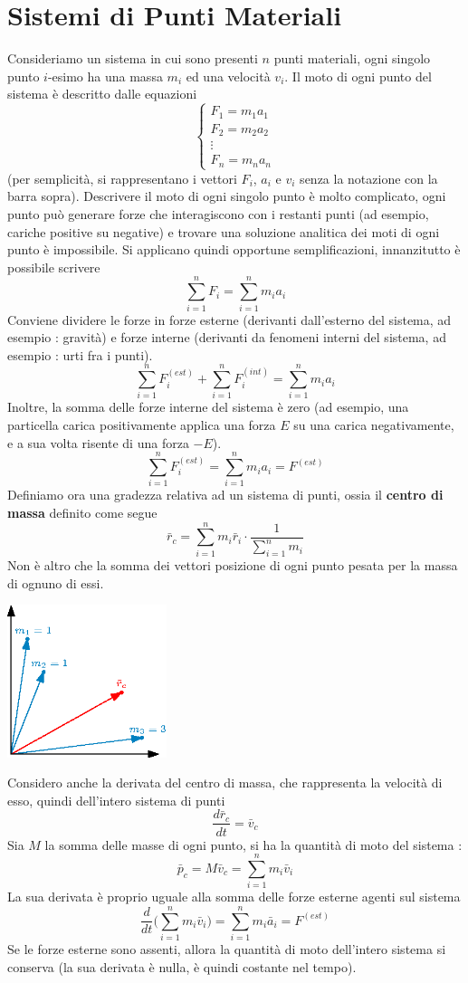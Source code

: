 \documentclass[10pt, letterpaper]{report}
\begin{document}
\section{Sistemi di Punti Materiali}
Consideriamo un sistema in cui sono presenti $n$ punti materiali, ogni singolo punto 
$i$-esimo ha una massa $m_i$ ed una velocità $v_i$. Il moto di ogni 
punto del sistema è descritto dalle equazioni 
$$ \begin{cases}
    F_1 = m_1a_1\\ 
    F_2 = m_2a_2\\ 
    \vdots \\
    F_n = m_na_n
\end{cases}$$
(per semplicità, si rappresentano i vettori $F_i$, $a_i$ e $v_i$ senza la notazione con la barra sopra). 
Descrivere il moto di ogni singolo punto è 
molto complicato, ogni punto può generare forze che interagiscono con 
i restanti punti (ad esempio, cariche positive su negative) e 
trovare una soluzione analitica dei moti di ogni punto è impossibile.
Si applicano quindi opportune semplificazioni, innanzitutto è possibile 
scrivere 
$$ \sum_{i=1}^n F_i = \sum_{i=1}^n m_ia_i$$
Conviene dividere le forze in forze esterne (derivanti dall'esterno del 
sistema, ad esempio : gravità) e forze interne (derivanti da fenomeni 
interni del sistema, ad esempio : urti fra i punti).
$$ \sum_{i=1}^n F_i^{(est)} +  \sum_{i=1}^n F_i^{(int)}  = \sum_{i=1}^n m_ia_i$$
Inoltre, la somma delle forze interne del sistema è zero (ad esempio, una particella carica 
positivamente applica una forza $E$ su una carica negativamente, e a sua volta 
risente di una forza $-E$).
$$ \sum_{i=1}^n F_i^{(est)}  = \sum_{i=1}^n m_ia_i = F^{(est)}$$
Definiamo ora una gradezza relativa ad un sistema di punti, 
ossia il \textbf{centro di massa} definito come segue 
$$ \bar r_c= 
 \sum_{i=1}^n m_i\bar r_i \cdot \frac{1}{\sum_{i=1}^n m_i}$$
Non è altro che la somma dei vettori posizione di ogni punto pesata per la massa 
di ognuno di essi.
\begin{center}
    \includegraphics[width=0.35\textwidth ]{images/centrodimassa.eps}
\end{center}
Considero anche la derivata del centro di massa, che rappresenta 
la velocità di esso, quindi dell'intero sistema di punti 
$$ \frac{d\bar r_c}{dt}=\bar v_c$$
Sia $M$ la somma delle masse di ogni punto, si ha la 
quantità di moto del sistema : 
$$ \bar p_c = M\bar v_c = \sum_{i=1}^n m_i\bar v_i $$
La sua derivata è proprio uguale alla somma delle forze esterne agenti sul 
sistema 
$$ \frac{d}{dt}\Big(\sum_{i=1}^n m_i\bar v_i \Big)=\sum_{i=1}^n m_i\bar a_i = F^{(est)} $$
Se le forze esterne sono assenti, allora la quantità di moto dell'intero sistema 
si conserva (la sua derivata è nulla, è quindi costante nel tempo). 
\end{document}
